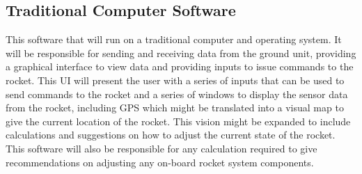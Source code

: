 \documentclass[10pt,draftclsnofoot,onecolumn]{IEEEtran}
\begin{document}
\subsection{Traditional Computer Software}
This software that will run on a traditional computer and operating system. It will be responsible for sending and receiving data from the ground unit, providing a graphical interface to view data and providing inputs to issue commands to the rocket. This UI will present the user with a series of inputs that can be used to send commands to the rocket and a series of windows to display the sensor data from the rocket, including GPS which might be translated into a visual map to give the current location of the rocket. This vision might be expanded to include calculations and suggestions on how to adjust the current state of the rocket. This software will also be responsible for any calculation required to give recommendations on adjusting any on-board rocket system components.
\end{document}
